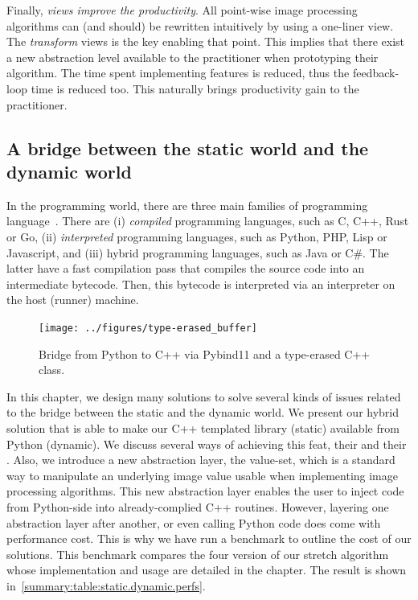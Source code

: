 Finally, \emph{views improve the productivity}. All point-wise image processing algorithms can (and should) be rewritten
intuitively by using a one-liner view. The \emph{transform} views is the key enabling that point. This implies that
there exist a new abstraction level available to the practitioner when prototyping their algorithm. The time spent
implementing features is reduced, thus the feedback-loop time is reduced too. This naturally brings productivity gain to
the practitioner.


\subsection*{A bridge between the static world and the dynamic world}


In the programming world, there are three main families of programming
language~\parencite{prechelt.2000.comparison}. There are (i) \emph{compiled} programming languages, such as C, C++, Rust
or Go, (ii) \emph{interpreted} programming languages, such as Python, PHP, Lisp or Javascript, and (iii) hybrid
programming languages, such as Java or C\#. The latter have a fast compilation pass that compiles the source code into
an intermediate bytecode. Then, this bytecode is interpreted via an interpreter on the host (runner) machine.

\begin{figure}[htbp]
  \centering
  \texttt{[image: ../figures/type-erased\_buffer]}
  \caption[]{Bridge from Python to C++ via Pybind11 and a type-erased C++ class.}
  \label{summary:fig:type-erased.buffer}
\end{figure}

In this chapter, we design many solutions to solve several kinds of issues related to the bridge between the static and
the dynamic world. We present our hybrid solution that is able to make our C++ templated library (static) available from
Python (dynamic). We discuss several ways of achieving this feat, their \pros and their \cons. Also, we introduce a new
abstraction layer, the value-set, which is a standard way to manipulate an underlying image value usable when
implementing image processing algorithms. This new abstraction layer enables the user to inject code from Python-side
into already-complied C++ routines. However, layering one abstraction layer after another, or even calling Python code
does come with performance cost. This is why we have run a benchmark to outline the cost of our solutions. This
benchmark compares the four version of our stretch algorithm whose implementation and usage are detailed in the chapter.
The result is shown in~\cref{summary:table:static.dynamic.perfs}.

